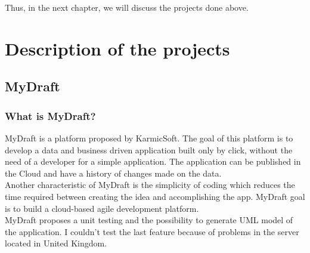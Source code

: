 \documentclass{report}
\begin{document}
Thus, in the next chapter, we will discuss the projects done above.

\chapter{Description of the projects}
\section{MyDraft}
\subsection{What is MyDraft?}
MyDraft is a platform proposed by KarmicSoft. The goal of this platform is to develop a data and business driven application built only by click, without the need of a developer for a simple application. The application can be published in the Cloud and have a history of changes made on the data.\\

Another characteristic of MyDraft is the simplicity of coding which reduces the time required between creating the idea and accomplishing the app. MyDraft goal is to build a cloud-based agile development platform.\\

MyDraft proposes a unit testing and the possibility to generate UML model of the application. I couldn't test the last feature because of problems in the server located in United Kingdom.\\
\end{document}
